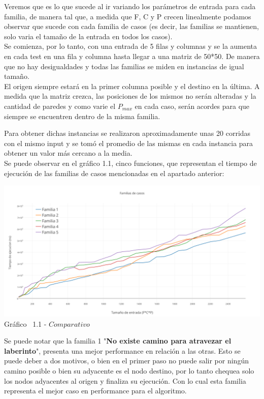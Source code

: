 \indent Veremos que es lo que sucede al ir variando los parámetros de entrada para cada familia, de manera tal que, a medida que F, C y P crecen linealmente podamos observar que sucede con cada familia de casos (es decir, las familias se mantienen, solo varia el tamaño de la entrada en todos los casos).\\
Se comienza, por lo tanto, con una entrada de 5 filas y columnas y se la aumenta en cada test en una fila y columna hasta llegar a una matriz de 50*50. De manera que no hay desigualdades y todas las familias se miden en instancias de igual tamaño.\\
El origen siempre estará en la primer columna posible y el destino en la última. A medida que la matriz crezca, las posiciones de los mismos no serán alteradas y la cantidad de paredes y como varie el $P_{max}$ en cada caso, serán acordes para que siempre se encuentren dentro de la misma familia.

Para obtener dichas instancias se realizaron aproximadamente unas 20 corridas con el mismo input y se tom\'o el promedio de las mismas en cada instancia para obtener un valor m\'as cercano a la media.\\ 

Se puede observar en el  gráfico 1.1, cinco funciones, que representan el tiempo de ejecuci\'on de las familias de casos mencionadas en el apartado anterior:\\

\vspace*{0.3cm} \vspace*{0.3cm}
  \begin{center}
 \includegraphics[scale=0.5]{./EJ1/comparativo.png}
 {Gr\'afico \ 1.1 - $Comparativo$}
  \end{center}
  \vspace*{0.3cm}
  
Se puede notar que la familia 1 "\textbf{No existe camino para atravezar el laberinto}", presenta una mejor performance en relaci\'on a las otras. Esto se puede deber a dos motivos, o bien en el primer paso no puede salir por ning\'un camino posible o bien su adyacente es el nodo destino, por lo tanto chequea solo los nodos adyacentes al origen y finaliza su ejecuci\'on. Con lo cual esta familia representa el mejor caso en performance para el algoritmo.

